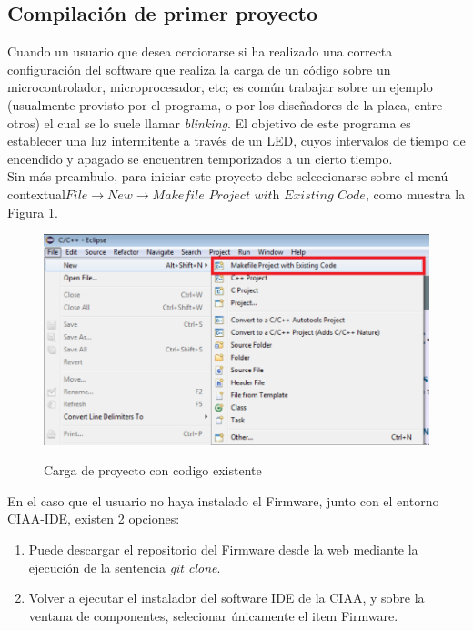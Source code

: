 \documentclass[12pt,letterpaper]{article}
\begin{document}
\subsection{Compilación de primer proyecto }
Cuando un usuario que desea cerciorarse si ha realizado una correcta configuración del software que realiza la carga de un código sobre un microcontrolador, microprocesador, etc; es común trabajar sobre un ejemplo (usualmente provisto por el programa, o por los diseñadores de la placa, entre otros) el cual se lo suele llamar \textit{blinking}. El objetivo de este programa es establecer una luz intermitente a través de un LED, cuyos intervalos de tiempo de encendido y apagado se encuentren temporizados a un cierto tiempo.\\
Sin más preambulo, para iniciar este proyecto debe seleccionarse sobre el menú contextual$ \textit{File}\rightarrow \textit{New}\rightarrow \textit{Makefile Project with Existing Code} $, como muestra la Figura \ref{primer_proy1}.

\begin{center}
\begin{figure}[!h]
\centering
\includegraphics[width=8 cm]{figuras/primer_proy1.png}\\
\caption{Carga de proyecto con codigo existente}
\label{primer_proy1}
\end{figure}
\end{center}

En el caso que el usuario no haya instalado el Firmware, junto con el entorno CIAA-IDE, existen 2 opciones:
\begin{enumerate}
\item Puede descargar el repositorio del Firmware desde la web mediante la ejecución de la sentencia \textit{git clone}.
\item Volver a ejecutar el instalador del software IDE de la CIAA, y sobre la ventana de componentes, selecionar únicamente el item Firmware.
\end{enumerate}
\end{document}

